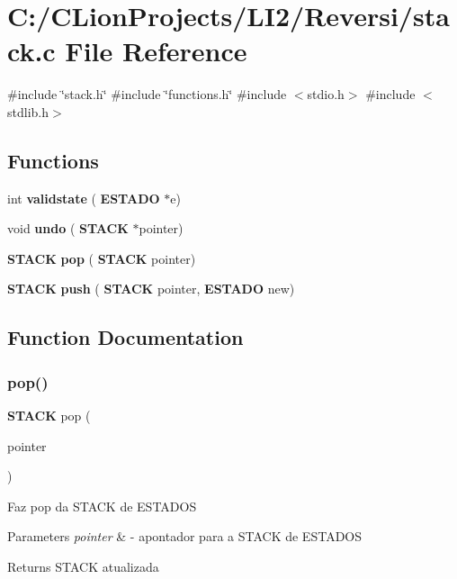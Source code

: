 \section{C\+:/\+C\+Lion\+Projects/\+L\+I2/\+Reversi/stack.c File Reference}
\label{stack_8c}
{\ttfamily \#include \char`\"{}stack.\+h\char`\"{}}\newline
{\ttfamily \#include \char`\"{}functions.\+h\char`\"{}}\newline
{\ttfamily \#include $<$stdio.\+h$>$}\newline
{\ttfamily \#include $<$stdlib.\+h$>$}\newline
\subsection*{Functions}
\begin{DoxyCompactItemize}
\item 
int \textbf{ validstate} (\textbf{ E\+S\+T\+A\+DO} $\ast$e)
\item 
void \textbf{ undo} (\textbf{ S\+T\+A\+CK} $\ast$pointer)
\item 
\textbf{ S\+T\+A\+CK} \textbf{ pop} (\textbf{ S\+T\+A\+CK} pointer)
\item 
\textbf{ S\+T\+A\+CK} \textbf{ push} (\textbf{ S\+T\+A\+CK} pointer, \textbf{ E\+S\+T\+A\+DO} new)
\end{DoxyCompactItemize}


\subsection{Function Documentation}
\mbox{\label{stack_8c_af3faabeca2390302dc29d6247269c146}} 
\subsubsection{pop()}
{\footnotesize\ttfamily \textbf{ S\+T\+A\+CK} pop (\begin{DoxyParamCaption}\item[{\textbf{ S\+T\+A\+CK}}]{pointer }\end{DoxyParamCaption})}

Faz pop da S\+T\+A\+CK de E\+S\+T\+A\+D\+OS 
\begin{DoxyParams}{Parameters}
{\em pointer} & -\/ apontador para a S\+T\+A\+CK de E\+S\+T\+A\+D\+OS \\
\hline
\end{DoxyParams}
\begin{DoxyReturn}{Returns}
S\+T\+A\+CK atualizada 
\end{DoxyReturn}
\mbox{\label{stack_8c_a8af8b53dd4115ebf6576c3fbd991bd73}} 
